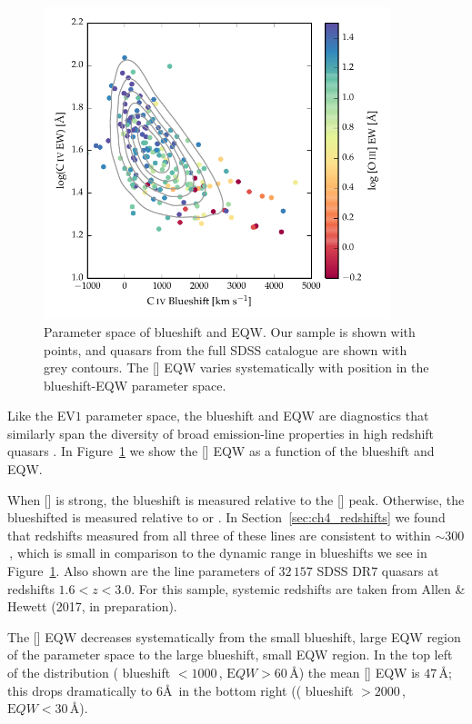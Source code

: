 \begin{figure}[t!]
\centering 
    \includegraphics[width=0.9\textwidth]{figures/chapter04/ev1.pdf} 
    \caption[]{Parameter space of  blueshift and EQW. Our sample is shown with points, and quasars from the full SDSS catalogue are shown with grey contours. The [] EQW varies systematically with position in the  blueshift-EQW parameter space.}      
    \label{fig:ev1}
\end{figure}

Like the EV$1$ parameter space, the  blueshift and EQW are diagnostics that similarly span the diversity of broad emission-line properties in high redshift quasars \citep{sulentic07,richards11}. 
In Figure~\ref{fig:ev1} we show the [] EQW as a function of the  blueshift and EQW.

When [] is strong, the  blueshift is measured relative to the [] peak. 
Otherwise, the  blueshifted is measured relative to \hb or \hans.  
In Section~\ref{sec:ch4_redshifts} we found that redshifts measured from all three of these lines are consistent to within $\sim300$\,\kms, which is small in comparison to the dynamic range in  blueshifts we see in Figure~\ref{fig:ev1}.
Also shown are the  line parameters of $32\,157$ SDSS DR$7$ quasars at redshifts $1.6 < z < 3.0$. 
For this sample, systemic redshifts are taken from Allen \& Hewett (2017, in preparation). 

The [] EQW decreases systematically from the small  blueshift, large EQW region of the parameter space to the large  blueshift, small EQW region.
In the top left of the distribution ( blueshift $<1000$\,\kms, ${\mathrm EQW} > 60$\,\AA) the mean [] EQW is $47$\,\AA; this drops dramatically to $6$\AA\, in the bottom right (( blueshift $>2000$\,\kms, ${\mathrm EQW} < 30$\,\AA). 

